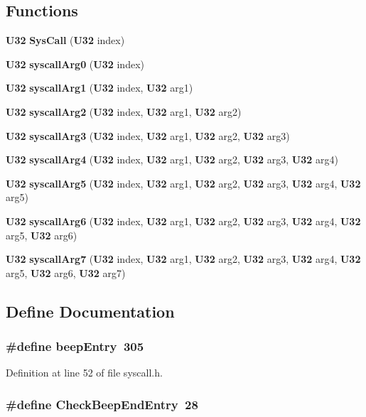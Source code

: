 \subsection*{Functions}
\begin{CompactItemize}
\item 
{\bf U32} {\bf Sys\-Call} ({\bf U32} index)
\item 
{\bf U32} {\bf syscall\-Arg0} ({\bf U32} index)
\item 
{\bf U32} {\bf syscall\-Arg1} ({\bf U32} index, {\bf U32} arg1)
\item 
{\bf U32} {\bf syscall\-Arg2} ({\bf U32} index, {\bf U32} arg1, {\bf U32} arg2)
\item 
{\bf U32} {\bf syscall\-Arg3} ({\bf U32} index, {\bf U32} arg1, {\bf U32} arg2, {\bf U32} arg3)
\item 
{\bf U32} {\bf syscall\-Arg4} ({\bf U32} index, {\bf U32} arg1, {\bf U32} arg2, {\bf U32} arg3, {\bf U32} arg4)
\item 
{\bf U32} {\bf syscall\-Arg5} ({\bf U32} index, {\bf U32} arg1, {\bf U32} arg2, {\bf U32} arg3, {\bf U32} arg4, {\bf U32} arg5)
\item 
{\bf U32} {\bf syscall\-Arg6} ({\bf U32} index, {\bf U32} arg1, {\bf U32} arg2, {\bf U32} arg3, {\bf U32} arg4, {\bf U32} arg5, {\bf U32} arg6)
\item 
{\bf U32} {\bf syscall\-Arg7} ({\bf U32} index, {\bf U32} arg1, {\bf U32} arg2, {\bf U32} arg3, {\bf U32} arg4, {\bf U32} arg5, {\bf U32} arg6, {\bf U32} arg7)
\end{CompactItemize}


\subsection{Define Documentation}
\subsubsection{\setlength{\rightskip}{0pt plus 5cm}\#define beep\-Entry\ 305}\label{syscall_8h_a19}




Definition at line 52 of file syscall.h.
\subsubsection{\setlength{\rightskip}{0pt plus 5cm}\#define Check\-Beep\-End\-Entry\ 28}\label{syscall_8h_a6}




